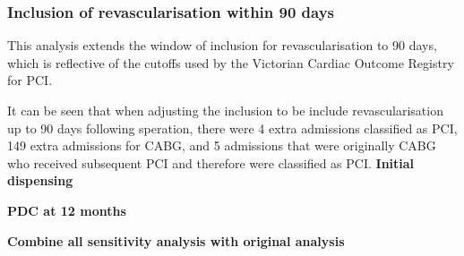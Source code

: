 \documentclass[11pt]{article}
\begin{document}
\subsubsection{Inclusion of revascularisation within 90 days}
This analysis extends the window of inclusion for revascularisation to 90 days, which is reflective of the cutoffs used by the Victorian Cardiac Outcome Registry for PCI. \cite{vcor2022}
\color{violet}
\begin{stlog}\end{stlog}
\color{black}
It can be seen that when adjusting the inclusion to be include revascularisation up to 90 days following speration, there were 4 extra admissions classified as PCI, 149 extra admissions for CABG, and 5 admissions that were originally CABG who received subsequent PCI and therefore were classified as PCI. 
\textbf{Initial dispensing}
\color{violet}
\begin{stlog}\end{stlog}
\color{black}
\textbf{PDC at 12 months}
\color{violet}
\begin{stlog}\end{stlog}
\color{black}
\textbf{Combine all sensitivity analysis with original analysis}
\color{violet}
\begin{stlog}\end{stlog}
\clearpage
\color{black}

\end{document}
